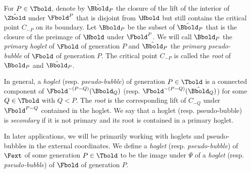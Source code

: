 \documentclass{amsart}
\begin{document}
\begin{definition}
\label{dfn:prim:bubble}
    For $P \in \Tbold$, denote by $\hat{\Bbold}_{P}$ the closure of the lift of the interior of $\hat{\Zbold}$ under $\Fbold^P$ that is disjoint from $\Hbold$ but still contains the critical point $C_{-P}$ on its boundary. 
    Let $\Bbold_{P}$ be the subset of $\hat{\Bbold}_{P}$ that is the closure of the preimage of $\Hbold$ under $\Fbold^P$. 
    We will call $\Bbold_P$ the \emph{primary hoglet} of $\Fbold$ of generation $P$ and $\hat{\Bbold}_P$ the \emph{primary pseudo-bubble} of $\Fbold$ of generation $P$. 
    The critical point $C_{-P}$ is called the \emph{root} of $\Bbold_P$ and $\hat{\Bbold}_P$.
    
    In general, a \emph{hoglet} (resp. \emph{pseudo-bubble}) of generation $P \in \Tbold$ is a connected component of $\Fbold^{-(P-Q)}(\Bbold_Q)$ (resp. $\Fbold^{-(P-Q)}(\hat{\Bbold}_Q)$) for some $Q \in \Tbold$ with $Q<P$. 
    The \emph{root} is the corresponding lift of $C_{-Q}$ under $\Fbold^{P-Q}$ contained in the hoglet. 
    We say that a hoglet (resp. pseudo-bubble) is \emph{secondary} if it is not primary and its root is contained in a primary hoglet.

    In later applications, we will be primarily working with hoglets and pseudo-bubbles in the external coordinates.
    We define a \emph{hoglet} (resp. \emph{pseudo-bubble}) of $\Fext$ of some generation $P \in \Tbold$ to be the image under $\Psi$ of a \emph{hoglet} (resp. \emph{pseudo-bubble}) of $\Fbold$ of generation $P$. 
\end{definition}
\end{document}
